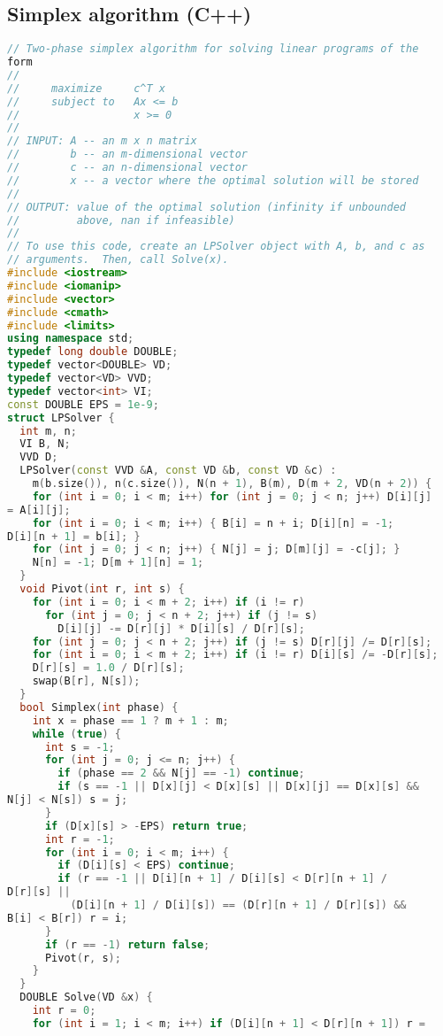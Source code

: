 \subsection{Simplex algorithm (C++)}
\begin{lstlisting}[language=C++]
// Two-phase simplex algorithm for solving linear programs of the 
form
//
//     maximize     c^T x
//     subject to   Ax <= b
//                  x >= 0
//
// INPUT: A -- an m x n matrix
//        b -- an m-dimensional vector
//        c -- an n-dimensional vector
//        x -- a vector where the optimal solution will be stored
//
// OUTPUT: value of the optimal solution (infinity if unbounded
//         above, nan if infeasible)
//
// To use this code, create an LPSolver object with A, b, and c as
// arguments.  Then, call Solve(x).
#include <iostream>
#include <iomanip>
#include <vector>
#include <cmath>
#include <limits>
using namespace std;
typedef long double DOUBLE;
typedef vector<DOUBLE> VD;
typedef vector<VD> VVD;
typedef vector<int> VI;
const DOUBLE EPS = 1e-9;
struct LPSolver {
  int m, n;
  VI B, N;
  VVD D;
  LPSolver(const VVD &A, const VD &b, const VD &c) :
    m(b.size()), n(c.size()), N(n + 1), B(m), D(m + 2, VD(n + 2)) {
    for (int i = 0; i < m; i++) for (int j = 0; j < n; j++) D[i][j] 
= A[i][j];
    for (int i = 0; i < m; i++) { B[i] = n + i; D[i][n] = -1; 
D[i][n + 1] = b[i]; }
    for (int j = 0; j < n; j++) { N[j] = j; D[m][j] = -c[j]; }
    N[n] = -1; D[m + 1][n] = 1;
  }
  void Pivot(int r, int s) {
    for (int i = 0; i < m + 2; i++) if (i != r)
      for (int j = 0; j < n + 2; j++) if (j != s)
        D[i][j] -= D[r][j] * D[i][s] / D[r][s];
    for (int j = 0; j < n + 2; j++) if (j != s) D[r][j] /= D[r][s];
    for (int i = 0; i < m + 2; i++) if (i != r) D[i][s] /= -D[r][s];
    D[r][s] = 1.0 / D[r][s];
    swap(B[r], N[s]);
  }
  bool Simplex(int phase) {
    int x = phase == 1 ? m + 1 : m;
    while (true) {
      int s = -1;
      for (int j = 0; j <= n; j++) {
        if (phase == 2 && N[j] == -1) continue;
        if (s == -1 || D[x][j] < D[x][s] || D[x][j] == D[x][s] && 
N[j] < N[s]) s = j;
      }
      if (D[x][s] > -EPS) return true;
      int r = -1;
      for (int i = 0; i < m; i++) {
        if (D[i][s] < EPS) continue;
        if (r == -1 || D[i][n + 1] / D[i][s] < D[r][n + 1] / 
D[r][s] ||
          (D[i][n + 1] / D[i][s]) == (D[r][n + 1] / D[r][s]) && 
B[i] < B[r]) r = i;
      }
      if (r == -1) return false;
      Pivot(r, s);
    }
  }
  DOUBLE Solve(VD &x) {
    int r = 0;
    for (int i = 1; i < m; i++) if (D[i][n + 1] < D[r][n + 1]) r = 

\end{lstlisting}
